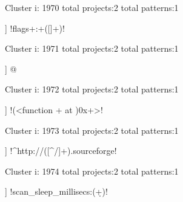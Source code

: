 Cluster i: 1970
total projects:2
total patterns:1
\begin{multicols}{1}
\begin{description}[noitemsep,topsep=0pt]
\item [[2] ] \cverb!flags\s+:\s+([\w\s]+)\n!
\end{description}
\end{multicols}







Cluster i: 1971
total projects:2
total patterns:1
\begin{multicols}{1}
\begin{description}[noitemsep,topsep=0pt]
\item [[2] ] \cverb@\?\?[=/\'\(\)\!<>\-]@
\end{description}
\end{multicols}







Cluster i: 1972
total projects:2
total patterns:1
\begin{multicols}{1}
\begin{description}[noitemsep,topsep=0pt]
\item [[2] ] \cverb!(<function \w+ at )0x\w+>!
\end{description}
\end{multicols}







Cluster i: 1973
total projects:2
total patterns:1
\begin{multicols}{1}
\begin{description}[noitemsep,topsep=0pt]
\item [[2] ] \cverb!^http://([^/]+).sourceforge!
\end{description}
\end{multicols}







Cluster i: 1974
total projects:2
total patterns:1
\begin{multicols}{1}
\begin{description}[noitemsep,topsep=0pt]
\item [[2] ] \cverb!scan_sleep_millisecs:(\d+)!
\end{description}
\end{multicols}







